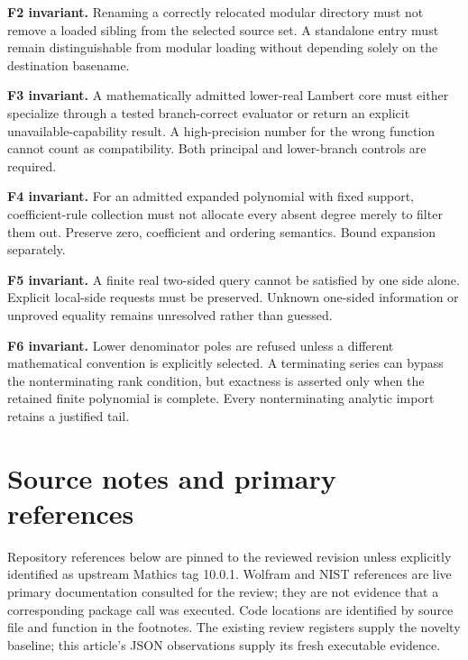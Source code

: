 \documentclass[11pt,letterpaper]{article}
\begin{document}
\textbf{F2 invariant.} Renaming a correctly relocated modular directory must not remove a loaded sibling from the selected source set. A standalone entry must remain distinguishable from modular loading without depending solely on the destination basename.

\textbf{F3 invariant.} A mathematically admitted lower-real Lambert core must either specialize through a tested branch-correct evaluator or return an explicit unavailable-capability result. A high-precision number for the wrong function cannot count as compatibility. Both principal and lower-branch controls are required.

\textbf{F4 invariant.} For an admitted expanded polynomial with fixed support, coefficient-rule collection must not allocate every absent degree merely to filter them out. Preserve zero, coefficient and ordering semantics. Bound expansion separately.

\textbf{F5 invariant.} A finite real two-sided query cannot be satisfied by one side alone. Explicit local-side requests must be preserved. Unknown one-sided information or unproved equality remains unresolved rather than guessed.

\textbf{F6 invariant.} Lower denominator poles are refused unless a different mathematical convention is explicitly selected. A terminating series can bypass the nonterminating rank condition, but exactness is asserted only when the retained finite polynomial is complete. Every nonterminating analytic import retains a justified tail.

\section{Source notes and primary references}

Repository references below are pinned to the reviewed revision unless explicitly identified as upstream Mathics tag 10.0.1. Wolfram and NIST references are live primary documentation consulted for the review; they are not evidence that a corresponding package call was executed. Code locations are identified by source file and function in the footnotes. The existing review registers supply the novelty baseline; this article's JSON observations supply its fresh executable evidence.
\end{document}
